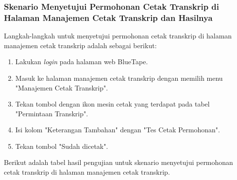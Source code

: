 \subsubsection{Skenario Menyetujui Permohonan Cetak Transkrip di Halaman Manajemen Cetak Transkrip dan Hasilnya}
\label{subsubsec:skenario_menyetujui_permohonan_cetak_transkrip_di_halaman_manajemen_cetak_transkrip}
Langkah-langkah untuk menyetujui permohonan cetak transkrip di halaman manajemen cetak transkrip adalah sebagai berikut:

\begin{enumerate}
    \item Lakukan \textit{login} pada halaman web BlueTape.
    \item Masuk ke halaman manajemen cetak transkrip dengan memilih menu "Manajemen Cetak Transkrip".
    \item Tekan tombol dengan ikon mesin cetak yang terdapat pada tabel "Permintaan Transkrip".
    \item Isi kolom "Keterangan Tambahan" dengan "Tes Cetak Permohonan".
    \item Tekan tombol "Sudah dicetak".
\end{enumerate}

Berikut adalah tabel hasil pengujian untuk skenario menyetujui permohonan cetak transkrip di halaman manajemen cetak transkrip.

